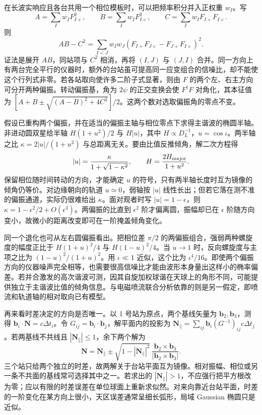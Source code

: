 在长波实响应且各台共用一个相位模板时，可以把频率积分并入正权重 $w_I$。写
\[
 A=\sum_I w_I F_{I+}^2,\qquad B=\sum_I w_I F_{I\times}^2,\qquad
 C=\sum_I w_I F_{I+}F_{I\times}.
\]
则
\[
 AB-C^2=\sum_{I<J}w_Iw_J(F_{I+}F_{J\times}-F_{J+}F_{I\times})^2 .
\]
证法是展开 $AB$，同站项与 $C^2$ 相消，再将 $(I,J)$ 与 $(J,I)$ 合并。同一方向上有两台完全平行的仪器时，额外的台站虽可提高同一应变组合的信噪比，却不能使这个行列式非零。若各站取向使许多二阶子式显著，则由 $F$ 的两个左、右主方向可分开两种偏振。转动偏振基，角为 $2\psi$ 的正交变换会使 $F^\dagger F$ 对角化，其本征值为 $[A+B\pm\sqrt{(A-B)^2+4C^2}]/2$。这两个数对选取偏振角的零点不变。

假设已重构两个偏振，并在适当的偏振主轴与相位零点下求得主谐波的椭圆半轴。非进动圆双星给半轴 $H(1+u^2)/2$ 与 $H|u|$，其中 $H\propto D_L^{-1}$，$u=\cos\iota$。两半轴之比 $\kappa=2|u|/(1+u^2)$ 与总距离无关。要由比值反推倾角，解二次方程得
\[
 |u|=\frac{\kappa}{1+\sqrt{1-\kappa^2}},\qquad
 H=\frac{2H_{\rm major}}{1+u^2}.
\]
保留相位随时间转动的方向，才能确定 $u$ 的符号，只有两半轴长度时互为镜像的倾角仍等价。对边缘朝向的轨道 $u\simeq0$，弱轴按 $|u|$ 线性长出；但若它落在测不准的偏振通道，实际仍很难给出 $\kappa$。面对观者时写 $|u|=1-\epsilon$，则 $\kappa=1-\epsilon^2/2+O(\epsilon^3)$。两偏振的比直到 $\epsilon^2$ 阶才偏离圆，振幅却已在 $\epsilon$ 阶随方向变小，故微小的距离改变即可在一阶掩盖倾角变化。

同一个退化也可从左右圆偏振看出。把相位差 $\pi/2$ 的两偏振组合，强弱两种螺旋度的幅度正比于 $H(1+u)^2/4$ 与 $H(1-u)^2/4$。当 $u\to1$ 时，反向螺旋度与主项之比为 $(1-u)^2/(1+u)^2$。用 $\iota\ll1$ 近似，这个比为 $\iota^4/16$。即使两个偏振方向的仪器噪声完全相等，也需要很高信噪比才能由波形本身量出这样小的椭率偏差。若并合激发的高次谐波可测，因其自旋加权球谐在天球上的角形不同，可能提供独立于主谐波比值的倾角信息。与电磁喷流联合分析依靠的则是另一假定，即喷流和轨道轴的相对取向已有模型。

再来看时差决定的方向是否唯一。以 1 号站为原点，两个基线矢量为 $\bm b_2,\bm b_3$，测得 $\bm b_i\cdot\bm N=c\Delta t_i$。令 $G_{ij}=\bm b_i\cdot\bm b_j$，解平面内的投影为 $\bm N_\parallel=\sum_{ij}\bm b_i(G^{-1})_{ij}c\Delta t_j$。若两基线不共线且 $|\bm N_\parallel|\le1$，余下两个解为
\[
 \bm N=\bm N_\parallel\pm
   \sqrt{1-|\bm N_\parallel|^2}\,
   \frac{\bm b_2\times\bm b_3}{|\bm b_2\times\bm b_3|}.
\]
三个站只给两个独立的时差，故两解关于台站平面互为镜像。相对振幅、相位或另一条不共面的基线常可选择其中之一。若求出的 $|\bm N_\parallel|>1$，不应强行把平方根改为零；应以有限的时差误差在单位球面上重新求似然。对来向靠近台站平面，时差的一阶变化在某方向上很小，天区误差通常呈细长弧形，局域 Gaussian 椭圆只是近似。

